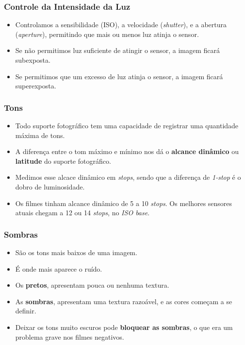 \begin{frame}
    \frametitle{Controle da Intensidade da Luz}
    \begin{itemize}
      \item Controlamos a sensibilidade (ISO), a velocidade (\textit{shutter}),
      e a abertura (\textit{aperture}), permitindo que mais ou menos luz atinja o sensor.
      \item Se não permitimos luz suficiente de atingir o sensor, a imagem ficará subexposta.
      \item Se permitimos que um excesso de luz atinja o sensor, a imagem ficará superexposta.
    \end{itemize}
\end{frame}




\begin{frame}
    \frametitle{Tons}
    \begin{itemize}
      \item Todo suporte fotográfico tem uma capacidade de registrar uma quantidade máxima de tons.
      \item A diferença entre o tom máximo e mínimo nos dá o \textbf{alcance dinâmico} ou \textbf{latitude}
      do suporte fotográfico.
      \item Medimos esse alcace dinâmico em \textit{stops}, sendo que a diferença de \textit{1-stop} é o dobro
      de luminosidade.
      \item Os filmes tinham alcance dinâmico de 5 a 10 \textit{stops}. Os melhores sensores atuais
      chegam a 12 ou 14 \textit{stops}, no \textit{ISO base}.
    \end{itemize}
\end{frame}

\begin{frame}
    \frametitle{Sombras}
    \begin{itemize}
      \item São os tons mais baixos de uma imagem.
      \item É onde mais aparece o ruído.
      \item Os \textbf{pretos}, apresentam pouca ou nenhuma textura.
      \item As \textbf{sombras}, apresentam uma textura razoável, e as cores
      começam a se definir.
      \item Deixar os tons muito escuros pode \textbf{bloquear as sombras}, o que era
      um problema grave nos filmes negativos.
    \end{itemize}
\end{frame}

